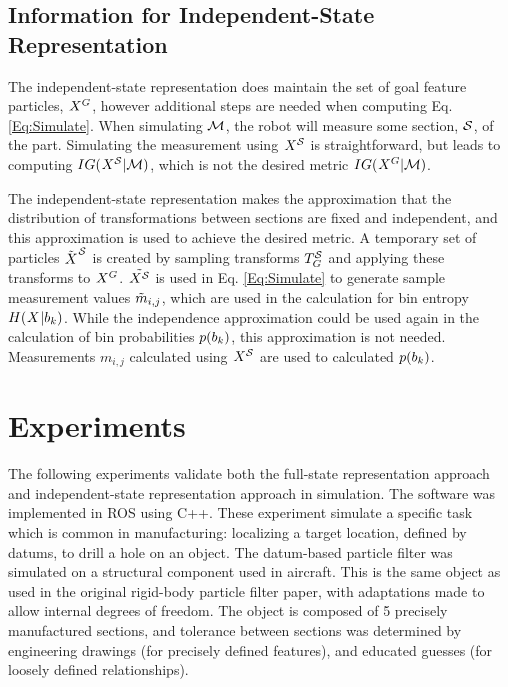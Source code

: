 \documentclass[../thesis.tex]{subfiles}
\begin{document}
\subsection{Information for Independent-State Representation}
The independent-state representation does maintain the set of goal feature particles, $\particles[][][G]$, however additional steps are needed when computing Eq. \ref{Eq:Simulate}.
When simulating $\mathcal{M}$, the robot will measure some section, $\mathcal{S}$, of the part.
Simulating the measurement using $\particles[][][\feature]$ is straightforward, but leads to computing $IG(\particles[][][\feature]|\maction)$, which is not the desired metric $IG(\particles[][][G]|\maction)$.


The independent-state representation makes the approximation that the distribution of transformations between sections are fixed and independent, and this approximation is used to achieve the desired metric.  
A temporary set of particles $\tilde \particles^\feature$ is created by sampling transforms $T_G^{\mathcal{S}}$ and applying these transforms to $\particles[][][G]$.
$\tilde {\particles[][][\feature]}$ is used in Eq. \ref{Eq:Simulate} to generate sample measurement values $\tilde {m}_{i,j}$, which are used in the calculation for bin entropy $H(\particles|\bin_k)$.
While the independence approximation could be used again in the calculation of bin probabilities $p(b_k)$, this approximation is not needed. 
Measurements $m_{i,j}$ calculated using $\particles[][][\feature]$ are used to calculated $p(b_k)$.



\section{Experiments} \label{sec:experiment}

The following experiments validate both the full-state representation approach and independent-state representation approach in simulation. 
The software was implemented in ROS using C++. 
These experiment simulate a specific task which is common in manufacturing: localizing a target location, defined by datums, to drill a hole on an object. 
The datum-based particle filter was simulated on a structural component used in aircraft. This is the same object as used in the original rigid-body particle filter paper\cite{Saund2017}, with adaptations made to allow internal degrees of freedom.
The object is composed of 5 precisely manufactured sections, and tolerance between sections was determined by engineering drawings (for precisely defined features), and educated guesses (for loosely defined relationships). 
\end{document}
